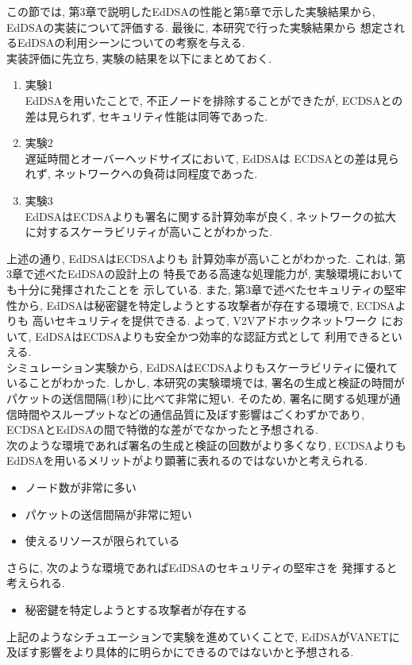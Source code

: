 この節では, 第3章で説明したEdDSAの性能と第5章で示した実験結果から, 
EdDSAの実装について評価する. 最後に, 本研究で行った実験結果から
想定されるEdDSAの利用シーンについての考察を与える.\\
\indent 実装評価に先立ち, 実験の結果を以下にまとめておく. 
\begin{enumerate}
  \item 実験1\\
  \indent EdDSAを用いたことで, 不正ノードを排除することができたが, 
  ECDSAとの差は見られず, セキュリティ性能は同等であった. 
  \item 実験2\\
  \indent 遅延時間とオーバーヘッドサイズにおいて, EdDSAは
  ECDSAとの差は見られず, ネットワークへの負荷は同程度であった.
  \item 実験3\\
  \indent EdDSAはECDSAよりも署名に関する計算効率が良く, 
  ネットワークの拡大に対するスケーラビリティが高いことがわかった.
\end{enumerate}

\indent 上述の通り, EdDSAはECDSAよりも
計算効率が高いことがわかった. これは, 第3章で述べたEdDSAの設計上の
特長である高速な処理能力が, 実験環境においても十分に発揮されたことを
示している. また, 第3章で述べたセキュリティの堅牢性から, 
EdDSAは秘密鍵を特定しようとする攻撃者が存在する環境で, ECDSAよりも
高いセキュリティを提供できる. よって, V2Vアドホックネットワーク
において, EdDSAはECDSAよりも安全かつ効率的な認証方式として
利用できるといえる. \\[0.5em]
\indent シミュレーション実験から, EdDSAはECDSAよりもスケーラビリティに優れていることがわかった. 
しかし, 本研究の実験環境では, 署名の生成と検証の時間が
パケットの送信間隔(1秒)に比べて非常に短い. そのため,
署名に関する処理が通信時間やスループットなどの通信品質に及ぼす影響はごくわずかであり,  
ECDSAとEdDSAの間で特徴的な差がでなかったと予想される. \\
\indent 次のような環境であれば署名の生成と検証の回数がより多くなり, 
ECDSAよりもEdDSAを用いるメリットがより顕著に表れるのではないかと考えられる. 
\begin{itemize}
  \item ノード数が非常に多い
  \item パケットの送信間隔が非常に短い
  \item 使えるリソースが限られている
\end{itemize}
さらに, 次のような環境であればEdDSAのセキュリティの堅牢さを
発揮すると考えられる. 
\begin{itemize}
  \item 秘密鍵を特定しようとする攻撃者が存在する
\end{itemize} 

\indent 上記のようなシチュエーションで実験を進めていくことで,
EdDSAがVANETに及ぼす影響をより具体的に明らかにできるのではないかと予想される.  






